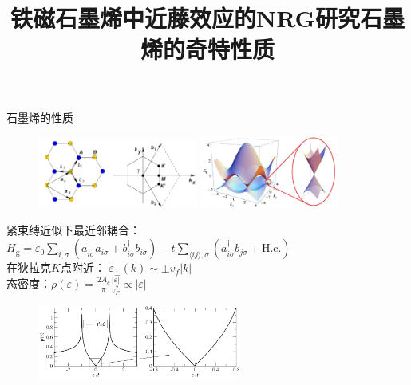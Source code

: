 \documentclass[9pt,t]{beamer} %
\begin{document}
\title{铁磁石墨烯中近藤效应的NRG研究\qquad \qquad \qquad 石墨烯的奇特性质}
\begin{frame}{石墨烯的性质}
\begin{figure}
\includegraphics[width=0.47\textwidth]{graphene2.png}
\includegraphics[width=0.4\textwidth]{graphene1.png}
\end{figure}
紧束缚近似下最近邻耦合：
$H_{\mathrm{g}}=\varepsilon_{0}\sum_{i, \sigma}\left(a_{i \sigma}^{\dagger} a_{i \sigma}+b_{i \sigma}^{\dagger} b_{i \sigma}\right) - t \sum_{\langle i j\rangle, \sigma} \left(a_{i \sigma}^{\dagger} b_{j \sigma}+\mathrm{H.c.}\right)$\\
在狄拉克$K$点附近： \qquad \qquad \qquad \quad $\varepsilon_{\pm}(k)\sim \pm v_f |k|$\\
态密度：\qquad \qquad \qquad \qquad \qquad \qquad  $\rho(\varepsilon)=\frac{2 A_{c}}{\pi} \frac{|\varepsilon|}{v_{F}^{2}}\propto |\varepsilon|$
\begin{figure}
\includegraphics[width=0.6\textwidth]{graphene-dos.png}
\end{figure}
\end{frame}
\end{document}
